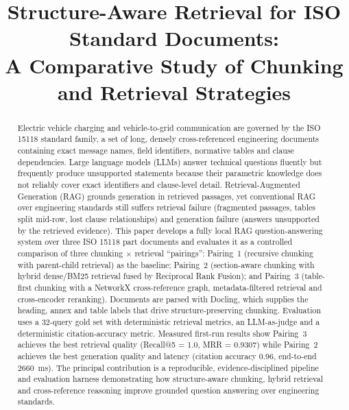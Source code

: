 \documentclass[conference]{IEEEtran}
\begin{document}
\title{Structure-Aware Retrieval for ISO Standard Documents:\\
A Comparative Study of Chunking and Retrieval Strategies}

\author{
\and
{}
}

\maketitle

\begin{abstract}
Electric vehicle charging and vehicle-to-grid communication are governed by the ISO 15118 standard family, a set of long, densely cross-referenced engineering documents containing exact message names, field identifiers, normative tables and clause dependencies. Large language models (LLMs) answer technical questions fluently but frequently produce unsupported statements because their parametric knowledge does not reliably cover exact identifiers and clause-level detail. Retrieval-Augmented Generation (RAG) grounds generation in retrieved passages, yet conventional RAG over engineering standards still suffers retrieval failure (fragmented passages, tables split mid-row, lost clause relationships) and generation failure (answers unsupported by the retrieved evidence). This paper develops a fully local RAG question-answering system over three ISO 15118 part documents and evaluates it as a controlled comparison of three chunking $\times$ retrieval ``pairings'': Pairing~1 (recursive chunking with parent-child retrieval) as the baseline; Pairing~2 (section-aware chunking with hybrid dense/BM25 retrieval fused by Reciprocal Rank Fusion); and Pairing~3 (table-first chunking with a NetworkX cross-reference graph, metadata-filtered retrieval and cross-encoder reranking). Documents are parsed with Docling, which supplies the heading, annex and table labels that drive structure-preserving chunking. Evaluation uses a 32-query gold set with deterministic retrieval metrics, an LLM-as-judge and a deterministic citation-accuracy metric. Measured first-run results show Pairing~3 achieves the best retrieval quality (Recall@5 = 1.0, MRR = 0.9307) while Pairing~2 achieves the best generation quality and latency (citation accuracy 0.96, end-to-end 2660~ms). The principal contribution is a reproducible, evidence-disciplined pipeline and evaluation harness demonstrating how structure-aware chunking, hybrid retrieval and cross-reference reasoning improve grounded question answering over engineering standards.
\end{abstract}
\end{document}
